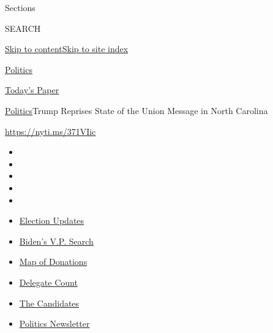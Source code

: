 Sections

SEARCH

\protect\hyperlink{site-content}{Skip to
content}\protect\hyperlink{site-index}{Skip to site index}

\href{https://www.nytimes.com/section/politics}{Politics}

\href{https://myaccount.nytimes.com/auth/login?response_type=cookie\&client_id=vi}{}

\href{https://www.nytimes.com/section/todayspaper}{Today's Paper}

\href{/section/politics}{Politics}\textbar{}Trump Reprises State of the
Union Message in North Carolina

\url{https://nyti.ms/371VIic}

\begin{itemize}
\item
\item
\item
\item
\item
\end{itemize}

\begin{itemize}
\item
  \href{https://www.nytimes.com/2020/07/31/us/elections/biden-vs-trump.html?action=click\&pgtype=Article\&state=default\&region=TOP_BANNER\&context=storylines_menu}{Election
  Updates}
\item
  \href{https://www.nytimes.com/article/biden-vice-president-2020.html?action=click\&pgtype=Article\&state=default\&region=TOP_BANNER\&context=storylines_menu}{Biden's
  V.P. Search}
\item
  \href{https://www.nytimes.com/interactive/2020/07/24/us/politics/trump-biden-campaign-donors.html?action=click\&pgtype=Article\&state=default\&region=TOP_BANNER\&context=storylines_menu}{Map
  of Donations}
\item
  \href{https://www.nytimes.com/interactive/2020/us/elections/delegate-count-primary-results.html?action=click\&pgtype=Article\&state=default\&region=TOP_BANNER\&context=storylines_menu}{Delegate
  Count}
\item
  \href{https://www.nytimes.com/interactive/2019/us/politics/2020-presidential-candidates.html?action=click\&pgtype=Article\&state=default\&region=TOP_BANNER\&context=storylines_menu}{The
  Candidates}
\item
  \href{https://www.nytimes.com/newsletters/politics?action=click\&pgtype=Article\&state=default\&region=TOP_BANNER\&context=storylines_menu}{Politics
  Newsletter}
\end{itemize}

